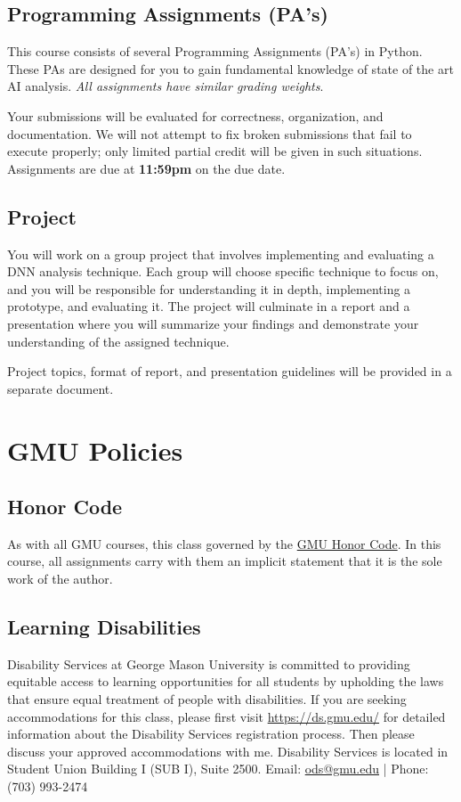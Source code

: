 \documentclass[11pt]{article}
\begin{document}
\subsection{Programming Assignments (PA's)}

This course consists of several Programming Assignments (PA's) in Python. These PAs are designed for you to gain fundamental knowledge of state of the art AI analysis. \emph{All assignments have similar grading weights}.

Your submissions will be evaluated for correctness,
organization, and documentation. We will not attempt to fix broken
submissions that fail to execute properly; only limited partial credit will be given in such situations. Assignments are due at \textbf{11:59pm} on the due date.

\subsection{Project}

You will work on a group project that involves implementing and evaluating a DNN analysis technique. Each group will choose specific technique to focus on, and you will be responsible for understanding it in depth, implementing a prototype, and evaluating it. The project will culminate in a report and a presentation where you will summarize your findings and demonstrate your understanding of the assigned technique.  

Project topics, format of report, and presentation guidelines will be provided in a separate document.


\newpage
\section{GMU Policies}
\subsection{Honor Code}\label{sec:honor-code}

As with all GMU courses, this class governed by the \href{https://academicstandards.gmu.edu}{GMU Honor Code}. In this course, all assignments carry with them an implicit statement that it is the sole work of the author.

\subsection{Learning Disabilities}

Disability Services at George Mason University is committed to providing equitable access to learning opportunities for all students by upholding the laws that ensure equal treatment of people with disabilities. If you are seeking accommodations for this class, please first visit \url{https://ds.gmu.edu/} for detailed information about the Disability Services registration process. Then please discuss your approved accommodations with me. Disability Services is located in Student Union Building I (SUB I), Suite 2500. Email: \href{mailto:ods@gmu.edu}{ods@gmu.edu} | Phone: (703) 993-2474
\end{document}
